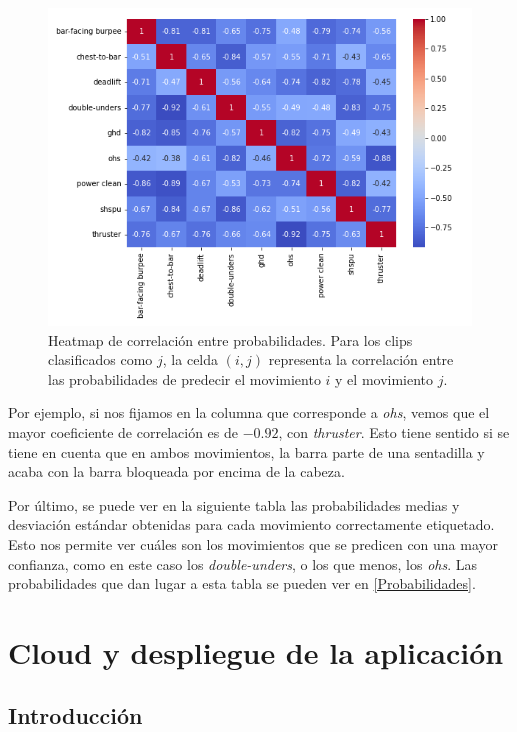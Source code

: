\begin{figure}[H]
    \centering
		\includegraphics[width=\textwidth]{figs/heatmap_correlations.png}
\caption{Heatmap de correlación entre probabilidades. Para los clips clasificados como $j$, la celda $(i, j)$ representa la correlación entre las probabilidades de predecir el movimiento $i$ y el movimiento $j$.}\label{heatmap_correlations}
\end{figure}

Por ejemplo, si nos fijamos en la columna que corresponde a \textit{ohs}, vemos que el mayor coeficiente de correlación es de $-0.92$, con \textit{thruster}. Esto tiene sentido si se tiene en cuenta que en ambos movimientos, la barra parte de una sentadilla y acaba con la barra bloqueada por encima de la cabeza.

Por último, se puede ver en la siguiente tabla las probabilidades medias y desviación estándar obtenidas para cada movimiento correctamente etiquetado. Esto nos permite ver cuáles son los movimientos que se predicen con una mayor confianza, como en este caso los \textit{double-unders}, o los que menos, los \textit{ohs}. Las probabilidades que dan lugar a esta tabla se pueden ver en \ref{Probabilidades}.




\section{Cloud y despliegue de la aplicación}\label{despliegue}

\subsection{Introducción}

